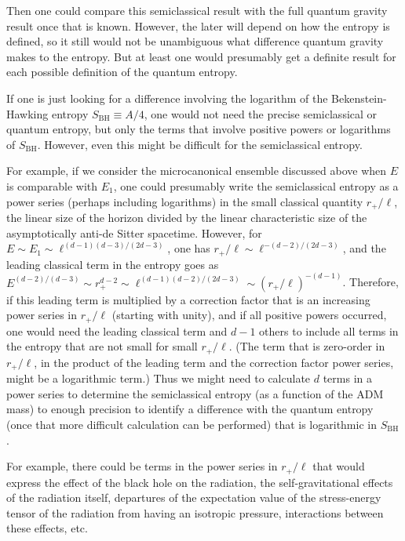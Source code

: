 \documentclass[12pt]{article} \usepackage{latexsym}
\begin{document}
Then one could compare this semiclassical result with the full quantum
gravity result once that is known.  However, the later will depend on
how the entropy is defined, so it still would not be unambiguous what
difference quantum gravity makes to the entropy.  But at least one
would presumably get a definite result for each possible definition of
the quantum entropy.

If one is just looking for a difference involving the logarithm of the
Bekenstein-Hawking entropy $S_{\mathrm{BH}} \equiv A/4$, one would not
need the precise semiclassical or quantum entropy, but only the terms
that involve positive powers or logarithms of $S_{\mathrm{BH}}$. 
However, even this might be difficult for the semiclassical entropy.

For example, if we consider the microcanonical ensemble discussed above
when $E$ is comparable with $E_1$, one could presumably write the
semiclassical entropy as a power series (perhaps including logarithms)
in the small classical quantity $r_+/\ell$, the linear size of the
horizon divided by the linear characteristic size of the asymptotically
anti-de Sitter spacetime.  However, for $E \sim E_1 \sim
\ell^{(d-1)(d-3)/(2d-3)}$, one has $r_+/\ell \sim
\ell^{-(d-2)/(2d-3)}$, and the leading classical term in the entropy
goes as $E^{(d-2)/(d-3)} \sim r_+^{d-2} \sim \ell^{(d-1)(d-2)/(2d-3)}
\sim (r_+/\ell)^{-(d-1)}$.  Therefore, if this leading term is
multiplied by a correction factor that is an increasing power series in
$r_+/\ell$ (starting with unity), and if all positive powers occurred,
one would need the leading classical term and $d-1$ others to include
all terms in the entropy that are not small for small $r_+/\ell$.  (The
term that is zero-order in $r_+/\ell$, in the product of the leading
term and the correction factor power series, might be a logarithmic
term.)  Thus we might need to calculate $d$ terms in a power series to
determine the semiclassical entropy (as a function of the ADM mass) to
enough precision to identify a difference with the quantum entropy
(once that more difficult calculation can be performed) that is
logarithmic in $S_{\mathrm{BH}}$.

For example, there could be terms in the power series in $r_+/\ell$
that would express the effect of the black hole on the radiation, the
self-gravitational effects of the radiation itself, departures of the
expectation value of the stress-energy tensor of the radiation from
having an isotropic pressure, interactions between these effects, etc.
\end{document}
